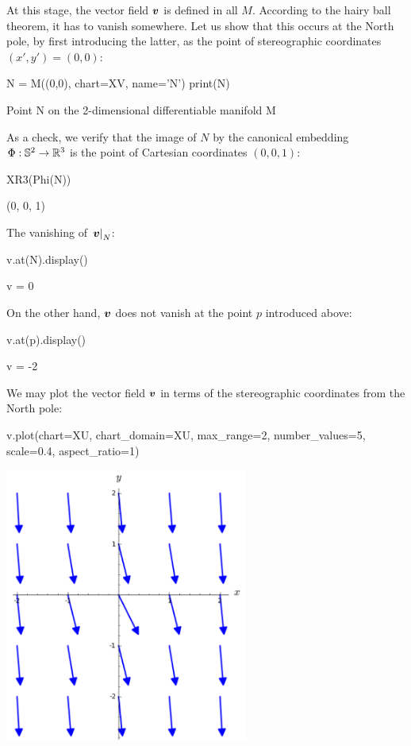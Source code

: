 At this stage, the vector field $\bm{v}$ is defined in all $M$.
According to the hairy ball theorem, it has to vanish somewhere.
Let us show that this occurs at the North pole, by first introducing the
latter, as the point of stereographic coordinates $(x',y')=(0,0)$:
\begin{NBin}
N = M((0,0), chart=XV, name='N')
print(N)
\end{NBin}
\begin{NBprint}
Point N on the 2-dimensional differentiable manifold M
\end{NBprint}
As a check, we verify that the image of $N$ by the canonical embedding
$\Phi: \mathbb{S}^2 \to \mathbb{R}^3$ is the point of Cartesian coordinates $(0,0,1)$:
\begin{NBin}
XR3(Phi(N))
\end{NBin}
\begin{NBoutM}
(0, 0, 1)
\end{NBoutM}
The vanishing of $\left.\bm{v}\right| _N$:
\begin{NBin}
v.at(N).display()
\end{NBin}
\begin{NBoutM}
v = 0
\end{NBoutM}
On the other hand, $\bm{v}$ does not vanish at the point $p$ introduced above:
\begin{NBin}
v.at(p).display()
\end{NBin}
\begin{NBoutM}
v =   -2 
\end{NBoutM}
We may plot the vector field $\bm{v}$ in terms of the stereographic coordinates
from the North pole:
\begin{NBin}
v.plot(chart=XU, chart_domain=XU, max_range=2,
       number_values=5, scale=0.4, aspect_ratio=1)
\end{NBin}
\begin{center}
\includegraphics[width=0.6\textwidth]{plot_v_North.png}
\end{center}
